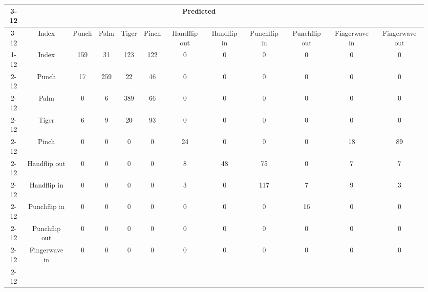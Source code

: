 \documentclass{standalone}
\begin{document}
 
 \begin{tabular}{|c |c |c |c |c |c |c |c |c |c |c |c |}
\cline{3-12}\multicolumn{2}{c|}{} & \multicolumn{10}{c|}{Predicted} \\ 
\cline{3-12} \multicolumn{2}{c |}{ } & Index & Punch & Palm & Tiger & Pinch & Handflip out & Handflip in & Punchflip in & Punchflip out & Fingerwave in & Fingerwave out\\ 
\cline{1-12}\multirow{10}{*}{\rotatebox[origin=c]{90}{Actual}} & Index & 159 & 31 & 123 & 122 & 0 & 0 & 0 & 0 & 0 & 0\\ 
 \cline{2-12} & Punch & 17 & 259 & 22 & 46 & 0 & 0 & 0 & 0 & 0 & 0\\ 
 \cline{2-12} & Palm & 0 & 6 & 389 & 66 & 0 & 0 & 0 & 0 & 0 & 0\\ 
 \cline{2-12} & Tiger & 6 & 9 & 20 & 93 & 0 & 0 & 0 & 0 & 0 & 0\\ 
 \cline{2-12} & Pinch & 0 & 0 & 0 & 0 & 24 & 0 & 0 & 0 & 18 & 89\\ 
 \cline{2-12} & Handflip out & 0 & 0 & 0 & 0 & 8 & 48 & 75 & 0 & 7 & 7\\ 
 \cline{2-12} & Handflip in & 0 & 0 & 0 & 0 & 3 & 0 & 117 & 7 & 9 & 3\\ 
 \cline{2-12} & Punchflip in & 0 & 0 & 0 & 0 & 0 & 0 & 0 & 16 & 0 & 0\\ 
 \cline{2-12} & Punchflip out & 0 & 0 & 0 & 0 & 0 & 0 & 0 & 0 & 0 & 0\\ 
 \cline{2-12} & Fingerwave in & 0 & 0 & 0 & 0 & 0 & 0 & 0 & 0 & 0 & 0\\ 
 \cline{2-12}\hline \end{tabular}
 
\end{document}
